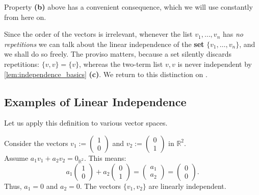 Property \textbf{(b)} above has a convenient consequence, which we will use constantly from here on.

\begin{notation}
\label{not:independence_of_a_set}
Since the order of the vectors is irrelevant, whenever the list $v_1, \dots, v_n$ has \emph{no repetitions} we can talk about the linear independence of the \textbf{set} $\{v_1, \dots, v_n\}$, and we shall do so freely. The proviso matters, because a set silently discards repetitions: $\{v, v\} = \{v\}$, whereas the two-term list $v, v$ is never independent by \cref{lem:independence_basics} \textbf{(c)}. We return to this distinction on .
\end{notation}

\subsection{Examples of Linear Independence}

Let us apply this definition to various vector spaces.

\begin{example}[In $\mathbb{R}^2$]
Consider the vectors $v_1 := \left(\begin{smallmatrix} 1 \\ 0 \end{smallmatrix}\right)$ and $v_2 := \left(\begin{smallmatrix} 0 \\ 1 \end{smallmatrix}\right)$ in $\mathbb{R}^2$. \\
Assume $a_1 v_1 + a_2 v_2 = 0_{\mathbb{R}^2}$. This means:
\[
a_1 \begin{pmatrix} 1 \\ 0 \end{pmatrix} + a_2 \begin{pmatrix} 0 \\ 1 \end{pmatrix}
    = \begin{pmatrix} a_1 \\ a_2 \end{pmatrix}
    = \begin{pmatrix} 0 \\ 0 \end{pmatrix}.
\]
Thus, $a_1 = 0$ and $a_2 = 0$. The vectors $\{v_1, v_2\}$ are linearly independent.
\end{example}

